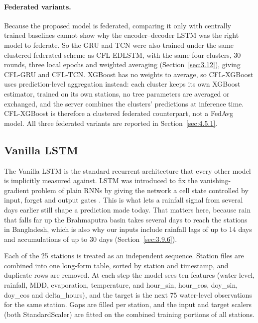 \paragraph{Federated variants.}
Because the proposed model is federated, comparing it only with centrally
trained baselines cannot show why the encoder--decoder LSTM was the right model
to federate. So the GRU and TCN were also trained under the same clustered
federated scheme as CFL-EDLSTM, with the same four clusters, 30 rounds, three
local epochs and weighted averaging (Section~\ref{sec:3.12}), giving CFL-GRU and
CFL-TCN. XGBoost has no weights to average, so CFL-XGBoost uses prediction-level
aggregation instead: each cluster keeps its own XGBoost estimator, trained on its
own stations, no tree parameters are averaged or exchanged, and the server
combines the clusters' predictions at inference time. CFL-XGBoost is therefore a
clustered federated counterpart, not a FedAvg model. All three federated
variants are reported in Section~\ref{sec:4.5.1}.

\subsection{Vanilla LSTM}
\label{sec:3.13.1}

The Vanilla LSTM is the standard recurrent architecture that every other model
is implicitly measured against. LSTM was introduced to fix the vanishing-gradient
problem of plain RNNs by giving the network a cell state controlled by input,
forget and output gates \cite{HochreiterSchmidhuber1997}. This is what lets a
rainfall signal from several days earlier still shape a prediction made today.
That matters here, because rain that falls far up the Brahmaputra basin takes
several days to reach the stations in Bangladesh, which is also why our inputs
include rainfall lags of up to 14 days and accumulations of up to 30 days
(Section~\ref{sec:3.9.6}).

Each of the 25 stations is treated as an independent sequence. Station files are
combined into one long-form table, sorted by station and timestamp, and
duplicate rows are removed. At each step the model sees ten features (water
level, rainfall, MDD, evaporation, temperature, and hour\_sin, hour\_cos,
doy\_sin, doy\_cos and delta\_hours), and the target is the next 75 water-level
observations for the same station. Gaps are filled per station, and the input
and target scalers (both StandardScaler) are fitted on the combined training
portions of all stations.

